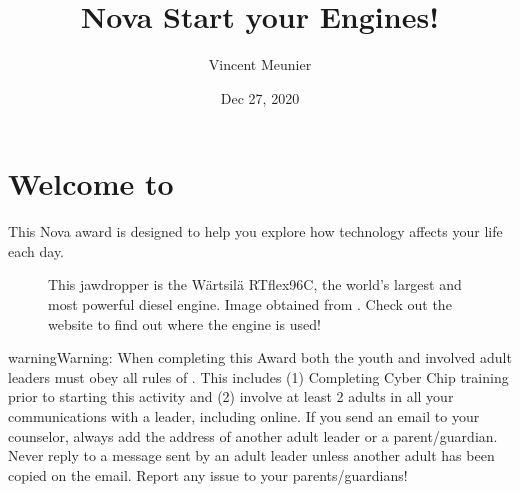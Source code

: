 \documentclass[letterpaper,10pt,english,openany,oneside]{sphinxmanual}
\title{Nova \sphinxhyphen{} Start your Engines!}
\date{Dec 27, 2020}
\author{Vincent Meunier}
\let\sphinxpxdimen\pdfpxdimen\else\newdimen\sphinxpxdimen
\begin{document}
\pagestyle{empty}
\sphinxmaketitle
\pagestyle{plain}
\sphinxtableofcontents
\pagestyle{normal}
\label{\detokenize{index::doc}}



\chapter{Welcome to }
\label{\detokenize{introduction:welcome-to-start-your-engines}}\label{\detokenize{introduction:introduction}}\label{\detokenize{introduction::doc}}
This Nova award is designed to help you explore how technology affects your life each day.

\begin{figure}[htbp]
\centering
\capstart

\noindent\sphinxincludegraphics[width=400\sphinxpxdimen]{{731.imgcache-1024x634}.jpg}
\caption{This jaw\sphinxhyphen{}dropper is the Wärtsilä RT\sphinxhyphen{}flex96C, the world’s largest and most powerful diesel engine. Image obtained from . Check out the website to find out where the engine is used!}\label{\detokenize{introduction:id1}}\end{figure}

\begin{sphinxadmonition}{warning}{Warning:}
When completing this Award both the youth and involved adult leaders must obey all rules of . This includes (1) Completing Cyber Chip training prior to starting this activity and (2)  involve at least 2 adults in all your communications with a leader, including online. If you send an email to your counselor, always add the address of another adult leader or a parent/guardian. Never reply to a message sent by an adult leader unless another adult has been copied on the email. Report any issue to your parents/guardians!
\end{sphinxadmonition}
\end{document}
